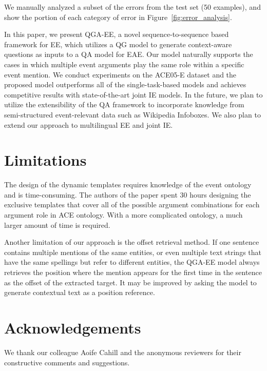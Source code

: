 We manually analyzed a subset of the errors from the test set (50 examples), and show the portion of each category of error in Figure~\ref{fig:error_analysis}.

In this paper, we present QGA-EE, a novel sequence-to-sequence based framework for EE, which utilizes a QG model to generate context-aware questions as inputs to a QA model for EAE. Our model naturally supports the cases in which multiple event arguments play the same role within a specific event mention. We conduct experiments on the ACE05-E dataset and the proposed model outperforms all of the single-task-based models and achieves competitive results with state-of-the-art joint IE models.
In the future, we plan to utilize the extensibility of the QA framework to incorporate knowledge from semi-structured event-relevant data such as Wikipedia Infoboxes. We also plan to extend our approach to multilingual EE and joint IE.\section*{Limitations}
The design of the dynamic templates requires knowledge of the event ontology and is time-consuming. The authors of the paper spent  30 hours designing the exclusive templates that cover all of the possible argument combinations for each argument role in ACE ontology. With a more complicated ontology, a much larger amount of time is required.

Another limitation of our approach is the offset retrieval method. If one sentence contains multiple mentions of the same entities, or even multiple text strings that have the same spellings but refer to different entities, the QGA-EE model always retrieves the position where the mention appears for the first time in the sentence as the offset of the extracted target. It may be improved by asking the model to generate contextual text as a position reference.

\section*{Acknowledgements}
We thank our colleague Aoife Cahill and the anonymous reviewers for their constructive comments and suggestions.

